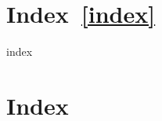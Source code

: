 \documentclass[12pt,draft]{book}
\begin{document}
\chapter{Index~\ref{index}}
\begin{cutflow}{index}
\label{index}
\printindex
\end{cutflow}
\else
\chapter{Index}
\printindex
\fi


\end{document}

